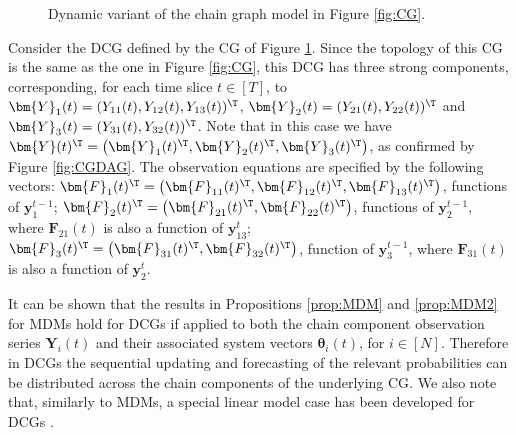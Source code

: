 \begin{figure}
\begin{center}
\end{center}
\caption{Dynamic variant of the chain graph model in Figure \ref{fig:CG}. \label{fig:DCG}}
\end{figure}

\begin{example}
Consider the \gls{DCG} defined by the \gls{CG} of Figure \ref{fig:DCG}. Since the topology of this \gls{CG} is the same as the one in Figure \ref{fig:CG}, this \gls{DCG} has three strong components, corresponding, for each time slice $t\in[T]$, to $\bm{Y}_1(t)=(Y_{11}(t),Y_{12}(t),Y_{13}(t))^\T$, $\bm{Y}_{2}(t)=(Y_{21}(t),Y_{22}(t))^\T$ and $\bm{Y}_{3}(t)=(Y_{31}(t),Y_{32}(t))^\T$. Note that in this case we have $\bm{Y}(t)^\T=\left(\bm{Y}_1(t)^\T,\bm{Y}_2(t)^\T,\bm{Y}_3(t)^\T\right)$, as confirmed by Figure \ref{fig:CGDAG}. The observation equations are specified by the following vectors: $\bm{F}_1(t)^\T=\left(\bm{F}_{11}(t)^\T,\bm{F}_{12}(t)^\T,\bm{F}_{13}(t)^\T\right)$, functions of $\bm{y}^{t-1}_1$; $\bm{F}_2(t)^\T=\left(\bm{F}_{21}(t)^\T,\bm{F}_{22}(t)^\T\right)$, functions of $\bm{y}^{t-1}_2$, where $\bm{F}_{21}(t)$ is also a function of $\bm{y}^t_{13}$; $\bm{F}_3(t)^\T=\left(\bm{F}_{31}(t)^\T,\bm{F}_{32}(t)^\T\right)$, function of $\bm{y}^{t-1}_3$, where $\bm{F}_{31}(t)$ is also a function of $\bm{y}^t_2$. 
\end{example}

It can be shown that the results in Propositions \ref{prop:MDM} and \ref{prop:MDM2} for \glspl{MDM} hold for \glspl{DCG} if applied to both the chain component observation series $\bm{Y}_i(t)$ and their associated system vectors $\bm{\theta}_i(t)$, for $i\in [N]$. Therefore in \glspl{DCG} the sequential updating and forecasting of the  relevant probabilities can be distributed across the chain components of the underlying \gls{CG}. We also note that, similarly to \glspl{MDM}, a special linear  model case has been developed for \glspl{DCG} \citep[see][]{Anacleto2013}. 


